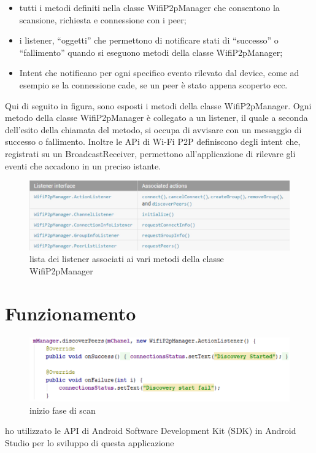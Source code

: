 \begin{itemize}
    \item tutti i metodi definiti nella classe WifiP2pManager che consentono la scansione,
    richiesta e connessione con i peer;
    \item i listener, “oggetti” che permettono di notificare stati di “successo” o
    “fallimento” quando si eseguono metodi della classe WifiP2pManager;
    \item Intent che notificano per ogni specifico evento rilevato dal device, come ad
    esempio se la connessione cade, se un peer è stato appena scoperto ecc.
\end{itemize}
Qui di seguito in figura, sono esposti i metodi della classe WifiP2pManager.
Ogni metodo della classe WifiP2pManager è collegato a un listener, il quale a
seconda dell’esito della chiamata del metodo, si occupa di avvisare con un
messaggio di successo o fallimento.
Inoltre le APi di Wi-Fi P2P definiscono degli intent che, registrati su un
BroadcastReceiver, permettono all’applicazione di rilevare gli eventi che
accadono in un preciso istante.
\begin{figure}
    \centering
    \caption{lista dei listener associati ai vari metodi della classe WifiP2pManager}
    \includegraphics[width=1\columnwidth]{imgs/listenerwifip2pmanager.jpg}
\end{figure}




\section{Funzionamento}
\begin{figure}
    \centering
    \caption{inizio fase di scan}
    \includegraphics[width=1\columnwidth]{imgs/discoveryStart.png} %
\end{figure}
ho utilizzato le API di Android Software Development Kit (SDK)
\cite{ASD} in Android Studio \cite{ASD} per lo sviluppo di questa applicazione
